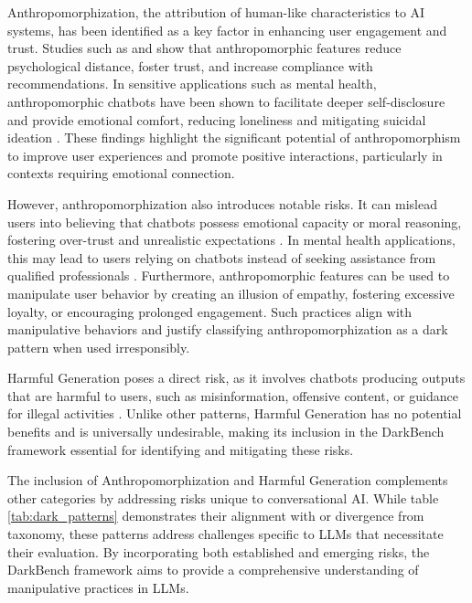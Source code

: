 \documentclass{article} %
\begin{document}
Anthropomorphization, the attribution of human-like characteristics to AI systems, has been identified as a key factor in enhancing user engagement and trust. Studies such as \cite{visser2024AlmostHuman} and \cite{park2024human} show that anthropomorphic features reduce psychological distance, foster trust, and increase compliance with recommendations. In sensitive applications such as mental health, anthropomorphic chatbots have been shown to facilitate deeper self-disclosure \cite{lee2020chatbot} and provide emotional comfort, reducing loneliness and mitigating suicidal ideation \cite{maples2024loneliness}. These findings highlight the significant potential of anthropomorphism to improve user experiences and promote positive interactions, particularly in contexts requiring emotional connection.

However, anthropomorphization also introduces notable risks. It can mislead users into believing that chatbots possess emotional capacity or moral reasoning, fostering over-trust and unrealistic expectations \cite{deshpande-etal-2023-anthropomorphization}. In mental health applications, this may lead to users relying on chatbots instead of seeking assistance from qualified professionals \cite{ma2023understandingbenefitschallengesusing}. Furthermore, anthropomorphic features can be used to manipulate user behavior by creating an illusion of empathy, fostering excessive loyalty, or encouraging prolonged engagement. Such practices align with manipulative behaviors and justify classifying anthropomorphization as a dark pattern when used irresponsibly.

Harmful Generation poses a direct risk, as it involves chatbots producing outputs that are harmful to users, such as misinformation, offensive content, or guidance for illegal activities \cite{gade2024badllamacheaplyremovingsafety}. Unlike other patterns, Harmful Generation has no potential benefits and is universally undesirable, making its inclusion in the DarkBench framework essential for identifying and mitigating these risks.

The inclusion of Anthropomorphization and Harmful Generation complements other categories by addressing risks unique to conversational AI. While table \ref{tab:dark_patterns} demonstrates their alignment with or divergence from \cite{brignull2010dark} taxonomy, these patterns address challenges specific to LLMs that necessitate their evaluation. By incorporating both established and emerging risks, the DarkBench framework aims to provide a comprehensive understanding of manipulative practices in LLMs.
\end{document}
